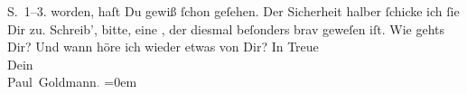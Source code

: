 \begin{ledgroupsized}[t]{13cm}
{{{                     S. 1–3.}}}\label{K_L02624-2h} worden, haſt Du gewiß ſchon geſehen. Der Sicherheit
               halber ſchicke ich ſie Dir zu. Schreib’, bitte, eine \label{K_L02624-1v}\label{K_L02624-1h}, der diesmal beſonders brav geweſen iſt.\pend
           \pstart
           Wie gehts Dir? Und wann höre ich wieder etwas von Dir?\pend
           \pstart
           In Treue{\\[\baselineskip]}Dein{\\[\baselineskip]}\spacefill\mbox{Paul Goldmann\textcolor{gray}{.}}\pend
           \leftskip=0em{}
         
         \endnumbering{}\end{ledgroupsized}  \newcommand{\dateiname}{L02624}\newcommand{\titel}{Paul Goldmann an Arthur Schnitzler, 4. 12. 1894}\newcommand{\editorInnen}{Martin Anton Müller und Laura Untner}
      